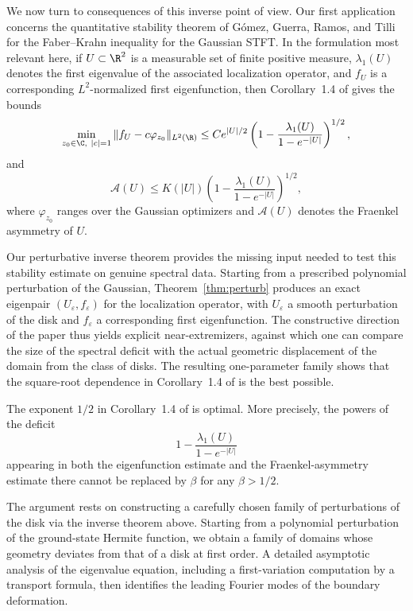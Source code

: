 We now turn to consequences of this inverse point of view. Our first application concerns the quantitative stability theorem of G\'omez, Guerra, Ramos, and Tilli for the Faber--Krahn inequality for the Gaussian STFT. In the formulation most relevant here, if $U\subset \R^2$ is a measurable set of finite positive measure, $\lambda_1(U)$ denotes the first eigenvalue of the associated localization operator, and $f_U$ is a corresponding $L^2$-normalized first eigenfunction, then Corollary~1.4 of \cite{Gomez-Guerra-Ramos-Tilli} gives the bounds
\[
\min_{z_0\in\C,\ |c|=1}\|f_U-c\varphi_{z_0}\|_{L^2(\R)}
\leq
C e^{|U|/2}
\left(
1-\frac{\lambda_1(U)}{1-e^{-|U|}}
\right)^{1/2},
\]
and
\[
\mathcal A(U)
\leq
K(|U|)
\left(
1-\frac{\lambda_1(U)}{1-e^{-|U|}}
\right)^{1/2},
\]
where $\varphi_{z_0}$ ranges over the Gaussian optimizers and $\mathcal A(U)$ denotes the Fraenkel asymmetry of $U$.

Our perturbative inverse theorem provides the missing input needed to test this stability estimate on genuine spectral data. Starting from a prescribed polynomial perturbation of the Gaussian, Theorem~\ref{thm:perturb} produces an exact eigenpair $(U_\varepsilon,f_\varepsilon)$ for the localization operator, with $U_\varepsilon$ a smooth perturbation of the disk and $f_\varepsilon$ a corresponding first eigenfunction. The constructive direction of the paper thus yields explicit near-extremizers, against which one can compare the size of the spectral deficit with the actual geometric displacement of the domain from the class of disks. The resulting one-parameter family shows that the square-root dependence in Corollary~1.4 of \cite{Gomez-Guerra-Ramos-Tilli} is the best possible.

\begin{theorem} \label{thm:GGRT-sharp}
The exponent $1/2$ in Corollary~1.4 of \cite{Gomez-Guerra-Ramos-Tilli} is optimal. More precisely, the powers of the deficit
\[
1-\frac{\lambda_1(U)}{1-e^{-|U|}}
\]
appearing in both the eigenfunction estimate and the Fraenkel-asymmetry estimate there cannot be replaced by $\beta$ for any $\beta>1/2$.
\end{theorem}

The argument rests on constructing a carefully chosen family of perturbations of the disk via the inverse theorem above. Starting from a polynomial perturbation of the ground-state Hermite function, we obtain a family of domains whose geometry deviates from that of a disk at first order. A detailed asymptotic analysis of the eigenvalue equation, including a first-variation computation by a transport formula, then identifies the leading Fourier modes of the boundary deformation.

